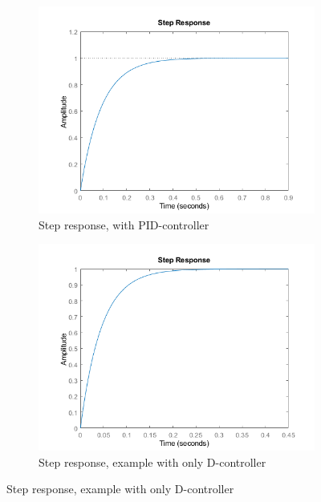 \begin{figure}[H]
    \caption{Plot of the transfer function of the system}
    \centering
    \begin{subfigure}[t]{0.48\textwidth}
        \includegraphics[width = \textwidth]{Images/Matlab_StepResponse.png}
        \caption{Step response, with PID-controller}
        \label{fig:Step-PID-control}
    \end{subfigure}
    \begin{subfigure}[t]{0.48\textwidth}
        \includegraphics[width = \textwidth]{Images/Matlab_StepResponse_D-controller.png}
        \caption{Step response, example with only D-controller}
        \label{fig:Step-D-control}
    \end{subfigure}  
\end{figure}


